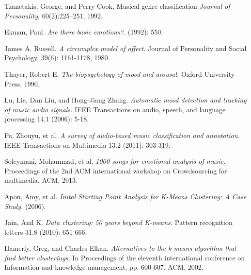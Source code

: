\begin{thebibliography}{9}
                Tzanetakis, George, and Perry Cook, Musical genre classification 
                \emph{Journal of Personality},
                60(2):225–251,
                1992.

                Ekman, Paul. 
                \emph{Are there basic emotions?.} 
                (1992): 550.

                James A. Russell. 
                \emph{A circumplex model of affect.} 
                Journal of Personality and Social Psychology, 39(6): 1161-1178, 1980.

                Thayer, Robert E. 
                \emph{The biopsychology of mood and arousal.} 
                Oxford University Press, 1990.


                Lu, Lie, Dan Liu, and Hong-Jiang Zhang. 
                \emph{Automatic mood detection and tracking of music audio signals.} 
                IEEE Transactions on audio, speech, and language processing 14.1 (2006): 5-18.

                Fu, Zhouyu, et al. 
                \emph{A survey of audio-based music classification and annotation.} 
                IEEE Transactions on Multimedia 13.2 (2011): 303-319.

                Soleymani, Mohammad, et al. 
                \emph{1000 songs for emotional analysis of music.} 
                Proceedings of the 2nd ACM international workshop on Crowdsourcing for multimedia. ACM, 2013.

                Apon, Amy, et al. 
                \emph{Inital Starting Point Analysis for K-Means Clustering: A Case Study.} 
                (2006).

                Jain, Anil K. 
                \emph{Data clustering: 50 years beyond K-means.} 
                Pattern recognition letters 31.8 (2010): 651-666.

                Hamerly, Greg, and Charles Elkan. 
                \emph{Alternatives to the k-means algorithm that find better clusterings.} 
                In Proceedings of the eleventh international conference on Information and knowledge management, pp. 600-607.
                ACM, 2002.

\end{thebibliography}
